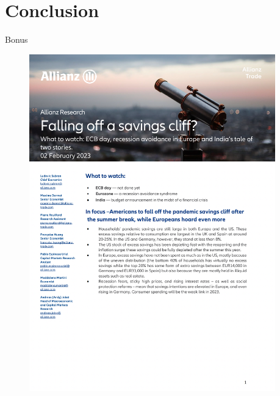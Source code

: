 \documentclass[9pt, xcolor={dvipsnames}]{beamer}
\begin{document}
\section{Conclusion}
\begin{frame}{Bonus}
  \begin{figure}
   \begin{columns}[c]
    \begin{column}{0.3\textwidth}
      \centering
      \includegraphics[width=1.3\textwidth]{img/az1.png}
    \end{column}
    \begin{column}{0.3\textwidth}
      \centering

\end{column}
\end{columns}
\end{figure}
\end{frame}
\end{document}
